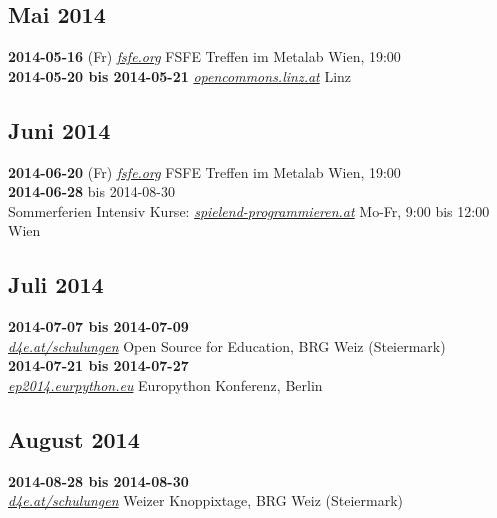 \documentclass[10pt,a4paper,ngerman,twoside]{article} %
\newcommand{\SepRule}{\noindent	%
\begin{center}
\rule{250pt}{1pt} %
\end{center}
}
\begin{document}
\subsection*{Mai 2014}
\textbf{2014-05-16} (Fr) \href{http://fsfe.org}{\textit{fsfe.org}} FSFE Treffen im Metalab Wien, 19:00\\
\textbf{2014-05-20 bis 2014-05-21} \href{http://www.opencommons.linz.at/}{\textit{opencommons.linz.at}} Linz\\
\subsection*{Juni 2014}
\textbf{2014-06-20} (Fr) \href{http://fsfe.org}{\textit{fsfe.org}} FSFE Treffen im Metalab Wien, 19:00\\
\textbf{2014-06-28} bis 2014-08-30\\ Sommerferien Intensiv Kurse: \href{http://spielend-programmieren.at}{\textit{spielend-programmieren.at}} Mo-Fr, 9:00 bis 12:00 Wien\\
\subsection*{Juli 2014}
\textbf{2014-07-07 bis 2014-07-09}\\ \href{http://d4e.at/schulungen/}{\textit{d4e.at/schulungen}} Open Source for Education, BRG Weiz (Steiermark)\\
\textbf{2014-07-21 bis 2014-07-27}\\ \href{https://ep2014.europython.eu/en/}{\textit{ep2014.eurpython.eu}} Europython Konferenz, Berlin\\
\subsection*{August 2014}
\textbf{2014-08-28 bis 2014-08-30}\\ \href{http://d4e.at/schulungen/}{\textit{d4e.at/schulungen}} Weizer Knoppixtage, BRG Weiz (Steiermark)\\

\end{document}
